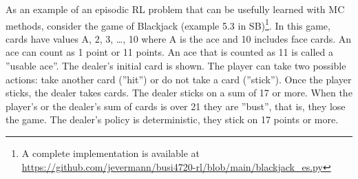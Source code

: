 As an example of an episodic RL problem that can be usefully learned with MC methods, consider the game of Blackjack (example 5.3 in SB)\footnote{A complete implementation is available at \url{https://github.com/jevermann/busi4720-rl/blob/main/blackjack_es.py}}. In this game,
cards have values A, 2, 3, \ldots, 10 where A is the ace and 10 includes face cards. An ace can count as 1 point or 11 points. An ace that is counted as 11 is called a ''usable ace''. The dealer's initial card is shown. The player can take two possible actions: take another card (''hit'') or do not take a card (''stick''). Once the player sticks, the dealer takes cards. The dealer sticks on a sum of 17 or more. When the player's or the dealer's sum of cards is over 21 they are ''bust'', that is, they lose the game. The dealer's policy is deterministic, they stick on 17 points or more. 

